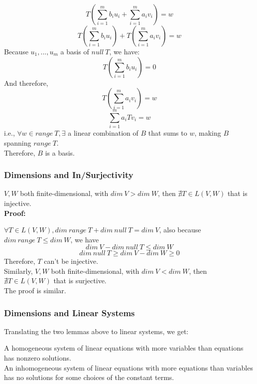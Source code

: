 \documentclass{article}
\begin{document}
\begin{addmargin}[1em]{0em}
\begin{equation*}
    T\left(\sum_{i=1}^{m} b_i u_i + \sum_{i=1}^{m} a_i v_i\right) = w
\end{equation*}
\begin{equation*}
    T\left(\sum_{i=1}^{m} b_i u_i\right) + T\left(\sum_{i=1}^{m} a_i v_i\right) = w
\end{equation*}
Because $u_1, ..., u_m$ a basis of $null\ T$, we have:
\begin{equation*}
    T\left(\sum_{i=1}^{m} b_i u_i\right) = 0
\end{equation*}
And therefore,
\begin{equation*}
    T\left(\sum_{i=1}^{m} a_i v_i\right) = w
\end{equation*}
\begin{equation*}
    \sum_{i=1}^{m} a_i Tv_i = w
\end{equation*}
i.e., $\forall w \in range\ T, \exists$ a linear combination of $B$ that sums to $w$, making $B$ spanning $range\ T$.\\
Therefore, $B$ is a basis.
\end{addmargin}
\subsubsection{Dimensions and In/Surjectivity}
$V, W$ both finite-dimensional, with $dim\ V > dim\ W$, then $\nexists T\in L(V, W)$ that is injective.\\
\textbf{Proof:}
\begin{addmargin}[1em]{0em}
$\forall T \in L(V,W), dim\ range\ T + dim\ null\ T = dim\ V$, also because $dim\ range\ T \leq dim\ W$, we have
\begin{equation*}
    dim\ V - dim\ null\ T \leq dim\ W
\end{equation*}
\begin{equation*}
    dim\ null\ T \geq dim\ V - dim\ W \geq 0
\end{equation*}
Therefore, $T$ can't be injective.\\
Similarly, $V, W$ both finite-dimensional, with $dim\ V < dim\ W$, then $\nexists T\in L(V, W)$ that is surjective.\\
The proof is similar.
\end{addmargin}
\subsubsection{Dimensions and Linear Systems}
Translating the two lemmas above to linear systems, we get:
\begin{addmargin}[1em]{0em}
A homogeneous system of linear equations with more variables than equations has nonzero solutions.\\
An inhomogeneous system of linear equations with more equations than variables has no solutions for some choices of the constant terms.
\end{addmargin}
\end{document}
